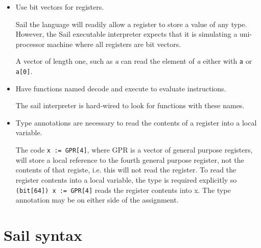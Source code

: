 \documentclass[11pt]{article}
\begin{document}
\begin{itemize}
\item Use bit vectors for registers.

Sail the language will readily allow a register to store a value of
any type. However, the Sail executable interpreter expects that it is
simulating a uni-processor machine where all registers are bit
vectors.

A vector of length one, such as \emph{a} can read the element of \emph{a}
either with {\tt a} or {\tt a[0]}.

\item Have functions named decode and execute to evaluate
  instructions.

The sail interpreter is hard-wired to look for functions with these names.

\item Type annotations are necessary to read the contents of a
  register into a local variable.

The code {\tt x := GPR[4]}, where GPR is a vector of general purpose
registers, will store a local reference to the fourth general purpose
register, not the contents of that registe, i.e. this will not read
the register. To read the register contents into a local variable, the
type is required explicitly so {\tt (bit[64]) x := GPR[4]} reads the
register contents into x. The type annotation may be on either side of
the assignment.

\end{itemize}



\section{Sail syntax}

\ottgrammartabular{
\ottl\ottinterrule
\ottannot\ottinterrule
\ottid\ottinterrule
\ottkid\ottinterrule
\ottbaseXXkind\ottinterrule
\ottkind\ottinterrule
\ottnexp\ottinterrule
\ottorder\ottinterrule
\ottbaseXXeffect\ottinterrule
\otteffect\ottinterrule
\otttyp\ottinterrule
\otttypXXarg\ottinterrule
\ottnXXconstraint\ottinterrule
\ottkindedXXid\ottinterrule
\ottquantXXitem\ottinterrule
\otttypquant\ottinterrule
\otttypschm\ottinterrule
\ottnameXXscmXXopt\ottinterrule
\otttypeXXdef\ottinterrule
\otttypeXXunion\ottinterrule
\ottindexXXrange\ottinterrule
\ottlit\ottinterrule
\ottsemiXXopt\ottinterrule
\ottpat\ottinterrule
\ottfpat\ottinterrule
\ottexp\ottinterrule
\ottlexp\ottinterrule
\ottfexp\ottinterrule
\ottfexps\ottinterrule
\ottoptXXdefault\ottinterrule
\ottpexp\ottinterrule
\otttannotXXopt\ottinterrule
\ottrecXXopt\ottinterrule
\otteffectXXopt\ottinterrule
\ottfuncl\ottinterrule
\ottfundef\ottinterrule
\ottletbind\ottinterrule
\ottvalXXspec\ottinterrule
\ottdefaultXXspec\ottinterrule
\ottscatteredXXdef\ottinterrule
\ottregXXid\ottinterrule
\ottaliasXXspec\ottinterrule
\ottdecXXspec\ottinterrule
\ottdef\ottinterrule
\ottdefs\ottinterrule}
\end{document}
